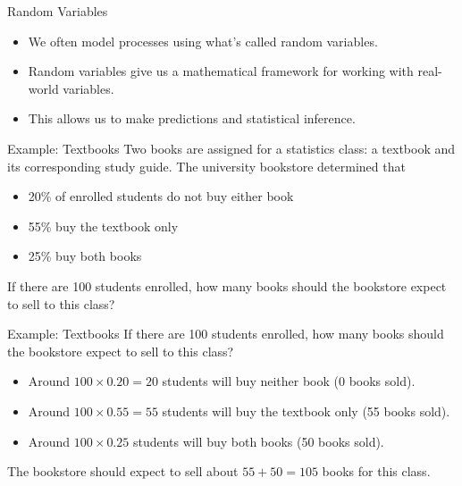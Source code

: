 \begin{frame}{Random Variables}
    \begin{itemize}
        \item We often model processes using what's called random variables.
        \item Random variables give us a mathematical framework for working with real-world variables.
        \item This allows us to make predictions and statistical inference.
    \end{itemize}
\end{frame}

\begin{frame}{Example: Textbooks}
    Two books are assigned for a statistics class: a textbook and its corresponding study guide. The university bookstore determined that
    \begin{itemize}
        \item 20\% of enrolled students do not buy either book
        \item 55\% buy the textbook only
        \item 25\% buy both books
    \end{itemize}
    If there are 100 students enrolled, how many books should the bookstore expect to sell to this class?
\end{frame}

\begin{frame}{Example: Textbooks}
    If there are 100 students enrolled, how many books should the bookstore expect to sell to this class?
    \begin{itemize}
        \item Around $100\times0.20=20$ students will buy neither book (0 books sold).
        \item Around $100\times0.55=55$ students will buy the textbook only (55 books sold).
        \item Around $100\times0.25$ students will buy both books (50 books sold).
    \end{itemize}
    The bookstore should expect to sell about $55+50=105$ books for this class.
\end{frame}

